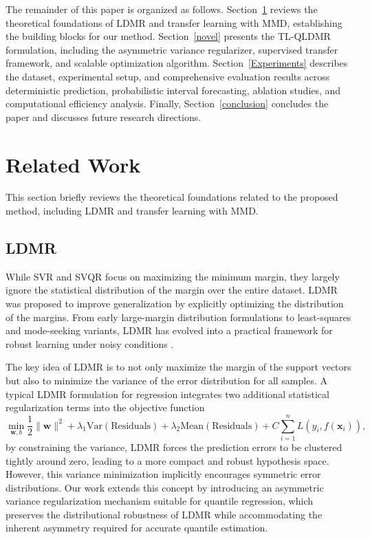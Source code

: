 \documentclass[a4paper]{cas-sc}
\begin{document}
The remainder of this paper is organized as follows. Section~\ref{rel} reviews the theoretical foundations of LDMR and transfer learning with MMD, establishing the building blocks for our method. Section~\ref{novel} presents the TL-QLDMR formulation, including the asymmetric variance regularizer, supervised transfer framework, and scalable optimization algorithm. Section~\ref{Experiments} describes the dataset, experimental setup, and comprehensive evaluation results across deterministic prediction, probabilistic interval forecasting, ablation studies, and computational efficiency analysis. Finally, Section~\ref{conclusion} concludes the paper and discusses future research directions.


\section{Related Work}\label{rel}
This section briefly reviews the theoretical foundations related to the proposed method, including LDMR and transfer learning with MMD.

\subsection{LDMR}
While SVR and SVQR focus on maximizing the minimum margin, they largely ignore the statistical distribution of the margin over the entire dataset. LDMR was proposed to improve generalization by explicitly optimizing the distribution of the margins.
From early large-margin distribution formulations to least-squares and mode-seeking variants, LDMR has evolved into a practical framework for robust learning under noisy conditions \citep{zhang2014large, zhang2019optimal, gupta2021least, hazarika2023mode}.

The key idea of LDMR is to not only maximize the margin of the support vectors but also to minimize the variance of the error distribution for all samples. A typical LDMR formulation for regression integrates two additional statistical regularization terms into the objective function
\begin{equation}
\label{eq:ldmr_concept}
\min_{\boldsymbol{w}, b} \frac{1}{2} \|\boldsymbol{w}\|^2 + \lambda_1 \text{Var}(\text{Residuals}) + \lambda_2 \text{Mean}(\text{Residuals}) + C \sum_{i=1}^{n} L(y_i, f(\boldsymbol{x}_i)),
\end{equation}
by constraining the variance, LDMR forces the prediction errors to be clustered tightly around zero, leading to a more compact and robust hypothesis space. However, this variance minimization implicitly encourages symmetric error distributions. Our work extends this concept by introducing an asymmetric variance regularization mechanism suitable for quantile regression, which preserves the distributional robustness of LDMR while accommodating the inherent asymmetry required for accurate quantile estimation.
\end{document}
